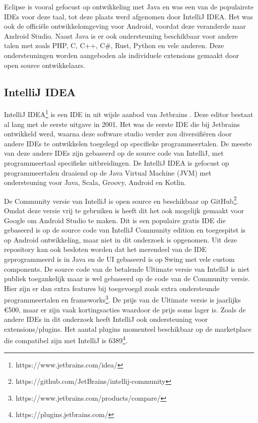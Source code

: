 Eclipse is vooral gefocust op ontwikkeling met Java en was een van de populairste IDEs voor deze taal, tot deze plaats werd afgenomen door IntelliJ IDEA. Het was ook de officiële ontwikkelomgeving voor Android, voordat deze veranderde naar Android Studio. Naast Java is er ook ondersteuning beschikbaar voor andere talen met zoals PHP, C, C++, C\#, Rust, Python en vele anderen. Deze ondersteuningen worden aangeboden als individuele extensions gemaakt door open source ontwikkelaars.

\newpage

\subsection{IntelliJ IDEA}
IntelliJ IDEA\footnote{https://www.jetbrains.com/idea/} is een IDE in uit wijde aanbod van Jetbrains \autocite{Krochmalski2014}. Deze editor bestaat al lang met de eerste uitgave in 2001. Het was de eerste IDE die bij Jetbrains ontwikkeld werd, waarna deze software studio verder zou diversifiëren door andere IDEs te ontwikkelen toegelegd op specifieke programmeertalen. De meeste van deze andere IDEs zijn gebaseerd op de source code van IntelliJ, met programmeertaal specifieke uitbreidingen. De IntelliJ IDEA is gefocust op programmeertalen draaiend op de Java Virtual Machine (JVM) met ondersteuning voor Java, Scala, Groovy, Android en Kotlin.

De Community versie van IntelliJ is open source en beschikbaar op GitHub\footnote{https://github.com/JetBrains/intellij-community}. Omdat deze versie vrij te gebruiken is heeft dit het ook mogelijk gemaakt voor Google om Android Studio te maken. Dit is een populaire gratis IDE die gebaseerd is op de source code van IntelliJ Community edition en toegespitst is op Android ontwikkeling, maar niet in dit onderzoek is opgenomen. Uit deze repository kan ook besloten worden dat het merendeel van de IDE geprogrammeerd is in Java en de UI gebaseerd is op Swing met vele custom components. De source code van de betalende Ultimate versie van IntelliJ is niet publiek toegankelijk maar is wel gebaseerd op de code van de Community versie. Hier zijn er dan extra features bij toegevoegd zoals extra ondersteunde programmeertalen en frameworks\footnote{https://www.jetbrains.com/products/compare/}. De prijs van de Ultimate versie is jaarlijks \euro{}500, maar er zijn vaak kortingsacties waardoor de prijs soms lager is.  Zoals de andere IDEs in dit onderzoek heeft IntelliJ ook ondersteuning voor extensions/plugins. Het aantal plugins momenteel beschikbaar op de marketplace die compatibel zijn met IntelliJ is 6389\footnote{https://plugins.jetbrains.com/}.

